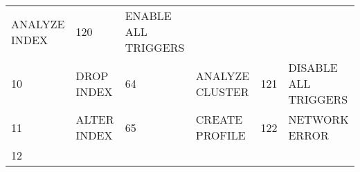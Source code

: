 \begin{longtable}[]{@{}llllll@{}}
\begin{minipage}[t]{0.24\columnwidth}
ANALYZE INDEX\strut
\end{minipage} & \begin{minipage}[t]{0.06\columnwidth}\raggedright\strut
120\strut
\end{minipage} & \begin{minipage}[t]{0.24\columnwidth}\raggedright\strut
ENABLE ALL TRIGGERS\strut
\end{minipage}\tabularnewline
\begin{minipage}[t]{0.06\columnwidth}\raggedright\strut
10\strut
\end{minipage} & \begin{minipage}[t]{0.19\columnwidth}\raggedright\strut
DROP INDEX\strut
\end{minipage} & \begin{minipage}[t]{0.06\columnwidth}\raggedright\strut
64\strut
\end{minipage} & \begin{minipage}[t]{0.24\columnwidth}\raggedright\strut
ANALYZE CLUSTER\strut
\end{minipage} & \begin{minipage}[t]{0.06\columnwidth}\raggedright\strut
121\strut
\end{minipage} & \begin{minipage}[t]{0.24\columnwidth}\raggedright\strut
DISABLE ALL TRIGGERS\strut
\end{minipage}\tabularnewline
\begin{minipage}[t]{0.06\columnwidth}\raggedright\strut
11\strut
\end{minipage} & \begin{minipage}[t]{0.19\columnwidth}\raggedright\strut
ALTER INDEX\strut
\end{minipage} & \begin{minipage}[t]{0.06\columnwidth}\raggedright\strut
65\strut
\end{minipage} & \begin{minipage}[t]{0.24\columnwidth}\raggedright\strut
CREATE PROFILE\strut
\end{minipage} & \begin{minipage}[t]{0.06\columnwidth}\raggedright\strut
122\strut
\end{minipage} & \begin{minipage}[t]{0.24\columnwidth}\raggedright\strut
NETWORK ERROR\strut
\end{minipage}\tabularnewline
\begin{minipage}[t]{0.06\columnwidth}\raggedright\strut
12\strut
\end{minipage} & \begin{minipage}[t]{0.19\columnwidth}\raggedright\strut

\end{minipage}
\end{longtable}
